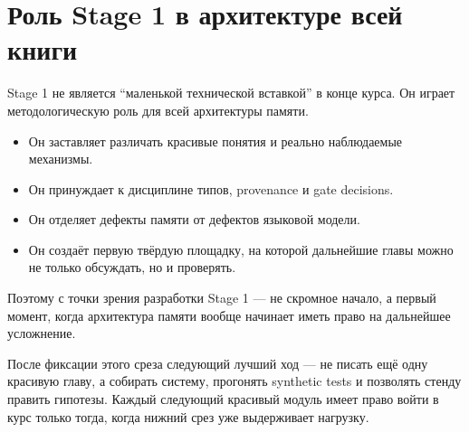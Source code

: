 \section{Роль Stage 1 в архитектуре всей книги}

Stage 1 не является ``маленькой технической вставкой'' в конце курса. Он
играет методологическую роль для всей архитектуры памяти.

\begin{itemize}\itemsep2pt
\item Он заставляет различать красивые понятия и реально наблюдаемые
механизмы.
\item Он принуждает к дисциплине типов, provenance и gate decisions.
\item Он отделяет дефекты памяти от дефектов языковой модели.
\item Он создаёт первую твёрдую площадку, на которой дальнейшие главы можно
не только обсуждать, но и проверять.
\end{itemize}

Поэтому с точки зрения разработки Stage 1 --- не скромное начало, а первый
момент, когда архитектура памяти вообще начинает иметь право на дальнейшее
усложнение.

\begin{principle}
После фиксации этого среза следующий лучший ход --- не писать ещё одну
красивую главу, а собирать систему, прогонять synthetic tests и позволять
стенду править гипотезы. Каждый следующий красивый модуль имеет право
войти в курс только тогда, когда нижний срез уже выдерживает нагрузку.
\end{principle}

